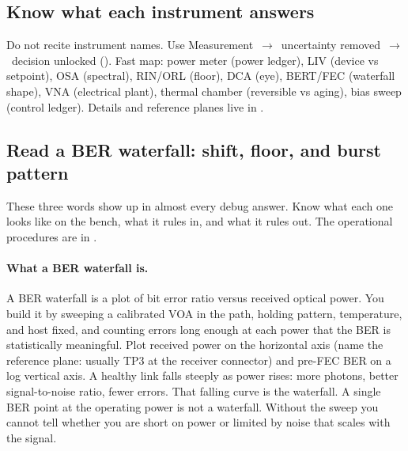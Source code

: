 
\subsection{Know what each instrument answers}

Do not recite instrument names. Use Measurement~$\rightarrow$~uncertainty
removed~$\rightarrow$~decision unlocked ().
Fast map: power meter (power ledger), LIV (device vs setpoint), OSA (spectral),
RIN/ORL (floor), DCA (eye), BERT/FEC (waterfall shape), VNA (electrical plant),
thermal chamber (reversible vs aging), bias sweep (control ledger). Details and
reference planes live in .

\subsection{Read a BER waterfall: shift, floor, and burst pattern}
\label{sec:interview-waterfall}

These three words show up in almost every debug answer. Know what each one
looks like on the bench, what it rules in, and what it rules out. The
operational procedures are in .

\paragraph{What a BER waterfall is.}
A BER waterfall is a plot of bit error ratio versus received optical power.
You build it by sweeping a calibrated VOA in the path, holding
pattern, temperature, and host fixed, and counting errors long enough at each
power that the BER is statistically meaningful. Plot received
power on the horizontal axis (name the reference plane: usually TP3 at the
receiver connector) and pre-FEC BER on a log vertical axis. A healthy link
falls steeply as power rises: more photons, better signal-to-noise ratio,
fewer errors. That falling curve is the waterfall. A single BER point at the
operating power is not a waterfall. Without the sweep you cannot tell whether
you are short on power or limited by noise that scales with the signal.

